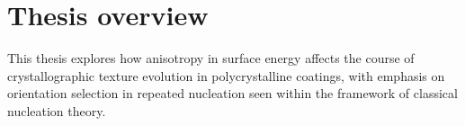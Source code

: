%




\section{Thesis overview} \label{sec_Thesis_overview}
This thesis explores how anisotropy in surface energy affects the course of crystallographic texture evolution in polycrystalline coatings, with emphasis on orientation selection in repeated nucleation seen within the framework of classical nucleation theory. 

